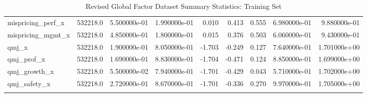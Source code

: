 \documentclass[12pt]{article}
\begin{document}
{\begin{landscape}
\begin{longtable}{|l|r|r|r|r|r|r|r|r|}
mispricing\_perf\_x      &  532218.0 &  5.500000e-01 &  1.990000e-01 &       0.010 &        0.413 &        0.555 &  6.980000e-01 &  9.880000e-01 \\
mispricing\_mgmt\_x      &  532218.0 &  4.850000e-01 &  1.800000e-01 &       0.015 &        0.376 &        0.503 &  6.060000e-01 &  9.430000e-01 \\
qmj\_x                  &  532218.0 &  1.900000e-01 &  8.050000e-01 &      -1.703 &       -0.249 &        0.127 &  7.640000e-01 &  1.701000e+00 \\
qmj\_prof\_x             &  532218.0 &  1.690000e-01 &  8.830000e-01 &      -1.704 &       -0.471 &        0.124 &  8.850000e-01 &  1.699000e+00 \\
qmj\_growth\_x           &  532218.0 &  5.500000e-02 &  7.940000e-01 &      -1.701 &       -0.429 &        0.043 &  5.710000e-01 &  1.702000e+00 \\
qmj\_safety\_x           &  532218.0 &  2.720000e-01 &  8.670000e-01 &      -1.701 &       -0.336 &        0.270 &  9.970000e-01 &  1.705000e+00 \\
\bottomrule
\caption{Revised Global Factor Dataset Summary Statistics: Training Set}
\label{table:ss-train}
\end{longtable}

\newpage


\end{landscape}}
\end{document}

